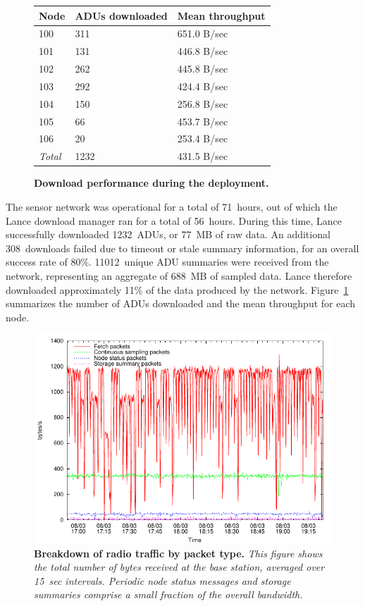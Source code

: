 \documentclass[lettersize]{sig-alternate-konrad}
\begin{document}
\begin{figure}[t]
\begin{center}
\begin{small}
\begin{tabular}{|l|l|l|} \hline 
{\bf Node}	& {\bf ADUs downloaded} & {\bf Mean throughput} \\ \hline
100 & 311 & 651.0 B/sec \\
101 & 131 & 446.8 B/sec \\
102 & 262 & 445.8 B/sec \\
103 & 292 & 424.4 B/sec \\
104 & 150 & 256.8 B/sec \\
105 & 66 & 453.7 B/sec \\
106 & 20 & 253.4 B/sec \\ \hline
{\em Total} & 1232 & 431.5 B/sec \\ \hline
\end{tabular}
\end{small}
\end{center}
\caption{\small {\bf Download performance during the deployment.}}
\label{fig-deploy-throughput}
\end{figure}

The sensor network was operational for a total of 71~hours, out of
which the Lance download manager ran for a total of 56~hours. 
During this time, Lance successfully downloaded 1232~ADUs, or 77~MB of 
raw data. An additional 308~downloads failed due to timeout or stale summary 
information, for an overall success rate of 80\%. 
11012~unique ADU summaries were received from the network,
representing an aggregate of 688~MB of sampled data. Lance therefore
downloaded approximately 11\% of the data produced by the network.
Figure~\ref{fig-deploy-throughput} summarizes the number of ADUs
downloaded and the mean throughput for each node. 

\begin{figure}[t]
\begin{center}
\includegraphics[width=0.9\hsize]{./figs/deploy/packetgraph/packetgraph.pdf}
\end{center}
\caption{\small {\bf Breakdown of radio traffic by packet type.}
{\em This figure shows the total number of bytes received at the base 
station, averaged over 15~sec intervals. Periodic node status messages
and storage summaries comprise a small fraction of the overall
bandwidth.}}
\label{fig-packetgraph}
\end{figure}
\end{document}
